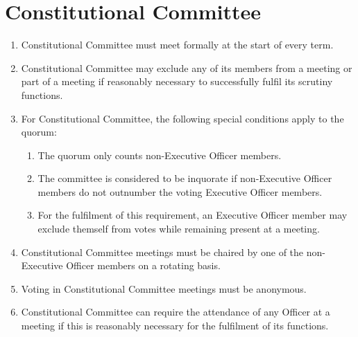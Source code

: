 \documentclass[12pt]{article}
\begin{document}
\section{Constitutional Committee}
\begin{enumerate}
    \item Constitutional Committee must meet formally at the start of every term.
    \item Constitutional Committee may exclude any of its members from a meeting or part of a meeting if reasonably necessary to successfully fulfil its scrutiny functions.
    \item For Constitutional Committee, the following special conditions apply to the quorum:
    \begin{enumerate}
        \item The quorum only counts non-Executive Officer members.
        \item The committee is considered to be inquorate if non-Executive Officer members do not outnumber the voting Executive Officer members.
        \item For the fulfilment of this requirement, an Executive Officer member may exclude themself from votes while remaining present at a meeting.
    \end{enumerate}
    \item Constitutional Committee meetings must be chaired by one of the non-Executive Officer members on a rotating basis.
    \item Voting in Constitutional Committee meetings must be anonymous.
    \item Constitutional Committee can require the attendance of any Officer at a meeting if this is reasonably necessary for the fulfilment of its functions.
\end{enumerate}
\end{document}
